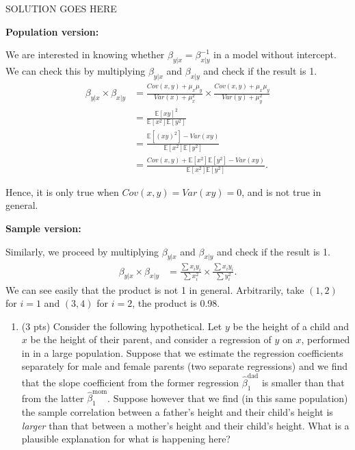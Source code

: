 \documentclass[
]{article}
\providecommand{\tightlist}{%
  \setlength{\itemsep}{0pt}\setlength{\parskip}{0pt}}
\begin{document}
SOLUTION GOES HERE

\textbf{Population version:}

We are interested in knowing whether \(\beta_{y|x} = \beta_{x|y}^{-1}\)
in a model without intercept. We can check this by multiplying
\(\beta_{y|x}\) and \(\beta_{x|y}\) and check if the result is 1.
\begin{align*}
    \beta_{y|x} \times \beta_{x|y} & = \frac{Cov(x,y)+\mu_x\mu_y}{Var(x)+\mu_x^2} 
    \times \frac{Cov(x,y)+\mu_x\mu_y}{Var(y)+\mu_y^2} \\
    & = \frac{\mathbb{E}\left[xy\right]^2}{\mathbb{E}\left[x^2\right]\mathbb{E}\left[y^2\right]} \\
    & = \frac{\mathbb{E}\left[(xy)^2\right]-Var(xy)}{\mathbb{E}\left[x^2\right]\mathbb{E}\left[y^2\right]} \\
    & = \frac{Cov(x,y)+\mathbb{E}\left[x^2\right]\mathbb{E}\left[y^2\right]-Var(xy)}{\mathbb{E}\left[x^2\right]\mathbb{E}\left[y^2\right]}.
\end{align*}

Hence, it is only true when \(Cov(x,y)=Var(xy)=0\), and is not true in
general.

\textbf{Sample version:}

Similarly, we proceed by multiplying \(\beta_{y|x}\) and \(\beta_{x|y}\)
and check if the result is 1. \begin{align*}
    \beta_{y|x} \times \beta_{x|y} & = \frac{\sum x_iy_i}{\sum x_i^2} \times \frac{\sum x_iy_i}{\sum y_i^2}.
\end{align*} We can see easily that the product is not 1 in general.
Arbitrarily, take \((1,2)\) for \(i=1\) and \((3,4)\) for \(i=2\), the
product is 0.98.

\begin{enumerate}
\def\labelenumi{\arabic{enumi}.}
\setcounter{enumi}{3}
\tightlist
\item
  (3 pts) Consider the following hypothetical. Let \(y\) be the height
  of a child and \(x\) be the height of their parent, and consider a
  regression of \(y\) on \(x\), performed in in a large population.
  Suppose that we estimate the regression coefficients separately for
  male and female parents (two separate regressions) and we find that
  the slope coefficient from the former regression
  \(\hat\beta_1^{\text{dad}}\) is smaller than that from the latter
  \(\hat\beta_1^{\text{mom}}\). Suppose however that we find (in this
  same population) the sample correlation between a father's height and
  their child's height is \emph{larger} than that between a mother's
  height and their child's height. What is a plausible explanation for
  what is happening here?
\end{enumerate}
\end{document}

